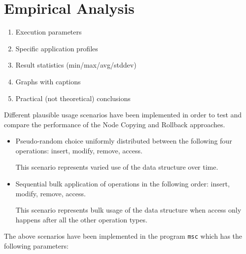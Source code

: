 \chapter{Empirical Analysis}

\begin{enumerate}
  \item Execution parameters
  \item Specific application profiles
  \item Result statistics (min/max/avg/stddev)
  \item Graphs with captions
  \item Practical (not theoretical) conclusions
\end{enumerate}

Different plausible usage scenarios have been implemented in order to test and
compare the performance of the Node Copying and Rollback approaches.

\begin{itemize}

  \item Pseudo-random choice uniformly distributed between the following four
  operations: insert, modify, remove, access.
  
  This scenario represents varied use of the data structure over time.

  \item Sequential bulk application of operations in the following order:
  insert, modify, remove, access.
  
  This scenario represents bulk usage of the data structure when access only
  happens after all the other operation types.

\end{itemize}

The above scenarios have been implemented in the program \texttt{msc} which has
the following parameters:

